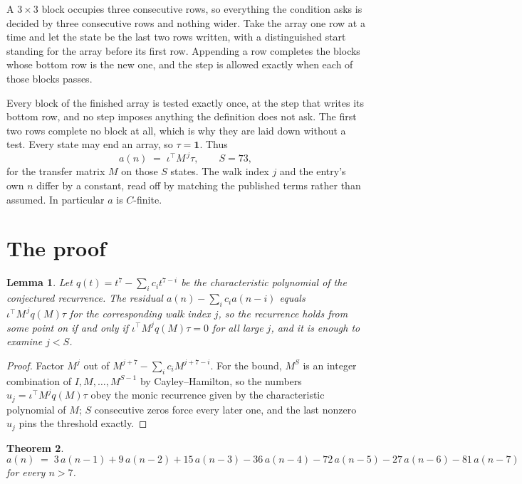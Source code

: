 \documentclass[11pt,a4paper]{article}
\theoremstyle{plain}
\newtheorem{theorem}{Theorem}
\newtheorem{lemma}[theorem]{Lemma}
\theoremstyle{definition}
\begin{document}
A $3\times3$ block occupies three consecutive rows, so everything the condition asks is decided
by three consecutive rows and nothing wider. Take the array one row at a time and let the state
be the last two rows written, with a distinguished start standing for the array before its
first row. Appending a row completes the blocks whose bottom row is the new one, and the step
is allowed exactly when each of those blocks passes.

Every block of the finished array is tested exactly once, at the step that writes its bottom
row, and no step imposes anything the definition does not ask. The first two rows complete no
block at all, which is why they are laid down without a test. Every state may end an array, so
$\tau=\mathbf{1}$. Thus
\[
a(n)\;=\;\iota^{\!\top}M^{\,j}\tau ,\qquad S=73,
\]
for the transfer matrix $M$ on those $S$ states. The walk index $j$ and the entry's own $n$
differ by a constant, read off by matching the published terms rather than assumed. In
particular $a$ is $C$-finite.

\section{The proof}

\begin{lemma}\label{lem:crit}
Let $q(t)=t^{7}-\sum_i c_it^{7-i}$ be the characteristic polynomial of the
conjectured recurrence. The residual $a(n)-\sum_ic_ia(n-i)$ equals
$\iota^{\!\top}M^{\,j}q(M)\tau$ for the corresponding walk index $j$, so the recurrence
holds from some point on if and only if $\iota^{\!\top}M^{j}q(M)\tau=0$ for all large $j$,
and it is enough to examine $j<S$.
\end{lemma}

\begin{proof}
Factor $M^{j}$ out of $M^{j+7}-\sum_ic_iM^{j+7-i}$. For the bound, $M^{S}$
is an integer combination of $I,M,\dots,M^{S-1}$ by Cayley--Hamilton, so the numbers
$u_j=\iota^{\!\top}M^{j}q(M)\tau$ obey the monic recurrence given by the characteristic
polynomial of $M$; $S$ consecutive zeros force every later one, and the last nonzero $u_j$
pins the threshold exactly.
\end{proof}

\begin{theorem}
\[
a(n)\;=\;3\,a(n-1) + 9\,a(n-2) + 15\,a(n-3) - 36\,a(n-4) - 72\,a(n-5) - 27\,a(n-6) - 81\,a(n-7)
\]
for every $n>7$.
\end{theorem}
\end{document}
